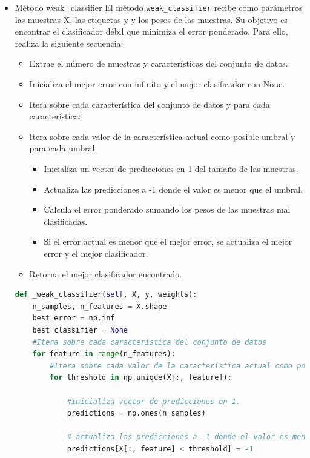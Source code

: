 \documentclass{article}
\begin{document}
\begin{itemize}
        \item Método weak\_classifier
        \newline
        El método \texttt{weak\_classifier} recibe como parámetros las muestras X, las etiquetas y y los pesos de las muestras.
        Su objetivo es encontrar el clasificador débil que minimiza el error ponderado.
        Para ello, realiza la siguiente secuencia:
        \begin{itemize}
            \item Extrae el número de muestras y características del conjunto de datos.
            \item Inicializa el mejor error con infinito y el mejor clasificador con None.
            \item Itera sobre cada característica del conjunto de datos y para cada característica:
            \item Itera sobre cada valor de la característica actual como posible umbral y para cada umbral:
            \begin{itemize}
                \item Inicializa un vector de predicciones en 1 del tamaño de las muestras.
                \item Actualiza las predicciones a -1 donde el valor es menor que el umbral.
                \item Calcula el error ponderado sumando los pesos de las muestras mal clasificadas.
                \item Si el error actual es menor que el mejor error, se actualiza el mejor error y el mejor clasificador.
            \end{itemize}
            \item Retorna el mejor clasificador encontrado.
        \end{itemize}
        \begin{lstlisting}[language=Python, caption={weak\_classifier method}, label={lst:weak_classifier_method}]
def _weak_classifier(self, X, y, weights):
    n_samples, n_features = X.shape
    best_error = np.inf
    best_classifier = None
    #Itera sobre cada característica del conjunto de datos
    for feature in range(n_features):
        #Itera sobre cada valor de la característica actual como posible umbral.
        for threshold in np.unique(X[:, feature]):

            #inicializa vector de predicciones en 1.
            predictions = np.ones(n_samples)

            # actualiza las predicciones a -1 donde el valor es menor que el umbral
            predictions[X[:, feature] < threshold] = -1


\end{lstlisting}
\end{itemize}
\end{document}
